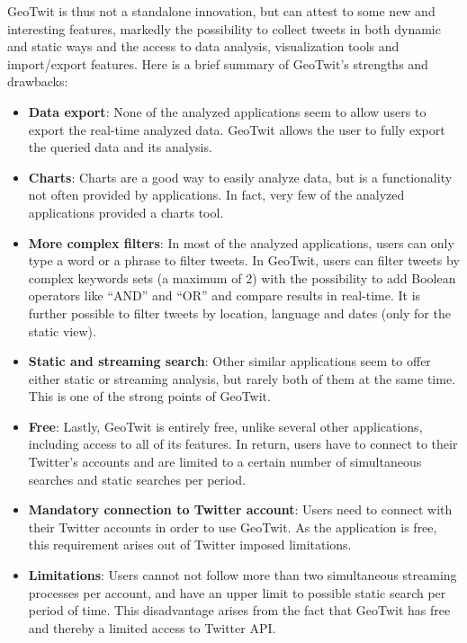 \documentclass[a4paper,11pt]{report}
\begin{document}
GeoTwit is thus not a standalone innovation, but can attest to some new and interesting features, markedly the possibility to collect tweets in both dynamic and static ways and the access to data analysis, visualization tools and import/export features. Here is a brief summary of GeoTwit's \color{ForestGreen}strengths \color{black}and \color{BrickRed}drawbacks\color{black}:\color{ForestGreen}
\renewcommand{\labelitemi}{\faicon{check-square}}
\begin{itemize}
	\item \textbf{Data export}: None of the analyzed applications seem to allow users to export the real-time analyzed data. GeoTwit allows the user to fully export the queried data and its analysis.
	\item \textbf{Charts}: Charts are a good way to easily analyze data, but is a functionality not often provided by applications. In fact, very few of the analyzed applications provided a charts tool.
	\item \textbf{More complex filters}: In most of the analyzed applications, users can only type a word or a phrase to filter tweets. In GeoTwit, users can filter tweets by complex keywords sets (a maximum of 2) with the possibility to add Boolean operators like “AND” and “OR” and compare results in real-time. It is further possible to filter tweets by location, language and dates (only for the static view).
	\item \textbf{Static and streaming search}: Other similar applications seem to offer either static or streaming analysis, but rarely both of them at the same time. This is one of the strong points of GeoTwit.
	\item \textbf{Free}: Lastly, GeoTwit is entirely free, unlike several other applications, including access to all of its features. In return, users have to connect to their Twitter's accounts and are limited to a certain number of simultaneous searches and static searches per period.\color{BrickRed}\renewcommand{\labelitemi}{\faicon{times}}
	\item \textbf{Mandatory connection to Twitter account}: Users need to connect with their Twitter accounts in order to use GeoTwit. As the application is free, this requirement arises out of Twitter imposed limitations.
	\item \textbf{Limitations}: Users cannot not follow more than two simultaneous streaming processes per account, and have an upper limit to possible static search per period of time. This disadvantage arises from the fact that GeoTwit has free and thereby a limited access to Twitter API.

\end{itemize}
\end{document}
